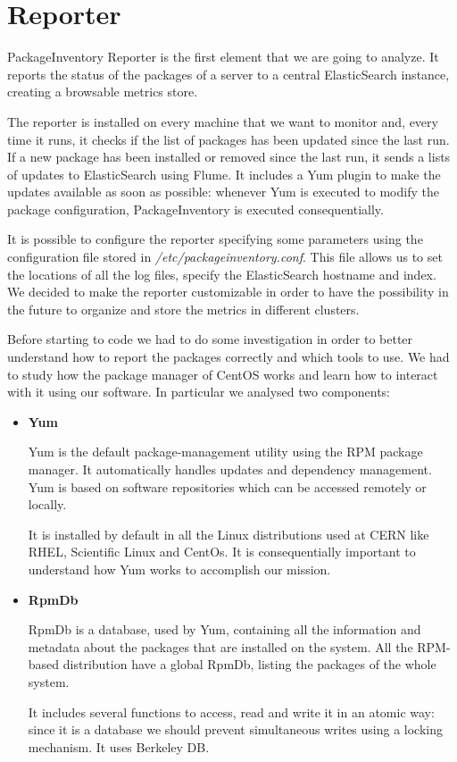 \section{Reporter}

PackageInventory Reporter is the first element that we are going to
analyze. It reports the status of the packages of a server to a central
ElasticSearch instance, creating a browsable metrics store.

The reporter is installed on every machine that we want to monitor and,
every time it runs, it checks if the list of packages has been updated
since the last run. If a new package has been installed or removed since
the last run, it sends a lists of updates to ElasticSearch using Flume. It
includes a Yum plugin to make the updates available as soon as possible:
whenever Yum is executed to modify the package configuration,
PackageInventory is executed consequentially.

It is possible to configure the reporter specifying some parameters using
the configuration file stored in \textit{/etc/packageinventory.conf}. This
file allows us to set the locations of all the log files, specify the
ElasticSearch hostname and index. We decided to make the reporter
customizable in order to have the possibility in the future to organize
and store the metrics in different clusters.

Before starting to code we had to do some investigation in order to better
understand how to report the packages correctly and which tools to use. We
had to study how the package manager of CentOS works and learn how to
interact with it using our software. In particular we analysed two
components: 

\begin{itemize}
  \item \textbf{Yum}

  Yum \cite{YumWebsite} is the default package-management utility using
  the RPM package manager. It automatically handles updates and dependency
  management. Yum is based on software repositories which can be accessed
  remotely or locally.
  
  It is installed by default in all the Linux distributions used at CERN
  like RHEL, Scientific Linux and CentOs. It is consequentially important
  to understand how Yum works to accomplish our mission.

  \item \textbf{RpmDb}

  RpmDb \cite{RpmDbWebsite} is a database, used by Yum, containing all the
  information and metadata about the packages that are installed on the
  system. All the RPM-based distribution have a global RpmDb, listing the
  packages of the whole system.
  
  It includes several functions to access, read and write it in an atomic
  way: since it is a database we should prevent simultaneous writes using
  a locking mechanism. It uses Berkeley DB.

\end{itemize}

